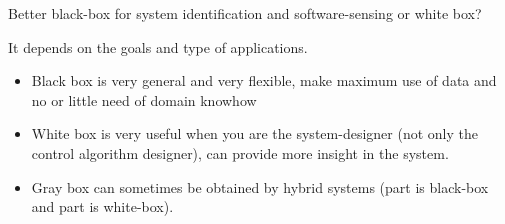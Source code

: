 Better black-box for system identification and software-sensing or white box?

It depends on the goals and type of applications.

\begin{itemize}
    \item Black box is very general and very flexible, make maximum use of data and no or little need of domain knowhow
    \item White box is very useful when you are the system-designer (not only the control algorithm designer), can provide more insight in the system.
    \item Gray box can sometimes be obtained by hybrid systems (part is black-box and part is white-box).
\end{itemize}
